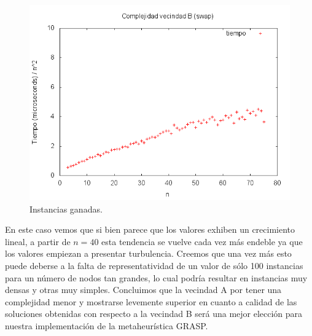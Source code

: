 \begin{figure}[H]
		\centering
		\includegraphics[width=\textwidth]{tiempos_vecindad_b.png}
		\caption{Instancias ganadas.}
		\label{fig:ej3_ejemplo}
\end{figure}

En este caso vemos que si bien parece que los valores exhiben un crecimiento lineal, a partir de $n = 40$
esta tendencia se vuelve cada vez más endeble ya que los valores empiezan a presentar turbulencia. Creemos
que una vez más esto puede deberse a la falta de representatividad de un valor de sólo 100 instancias para
un número de nodos tan grandes, lo cual podría resultar en instancias muy densas y otras muy simples.
Concluimos que la vecindad A por tener una complejidad menor y mostrarse levemente superior en cuanto
a calidad de las soluciones obtenidas con respecto a la vecindad B será una mejor elección para nuestra
implementación de la metaheurística GRASP.
